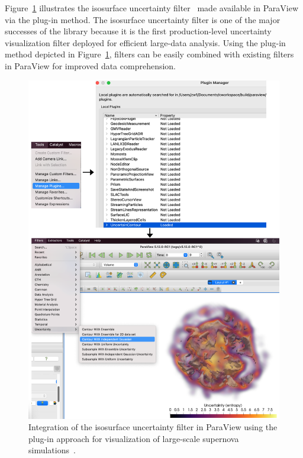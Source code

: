 Figure~\ref{fig:uncertainty-plugin} illustrates the \vtkm isosurface uncertainty filter~\citep{Wang2023, Athawale21} made available in ParaView via the plug-in method. The isosurface uncertainty filter is one of the major successes of the \vtkm library because it is the first production-level uncertainty visualization filter deployed for efficient large-data analysis. Using the plug-in method depicted in Figure~\ref{fig:uncertainty-plugin}, \vtkm filters can be easily combined with existing filters in ParaView for improved data comprehension.

\begin{figure}[htb]
  \includegraphics[width=\linewidth]{figures/isosurfaceUncertaintyPlugin.png}
  \caption{Integration of the \vtkm isosurface uncertainty filter in ParaView using the plug-in approach for visualization of large-scale supernova simulations~\citep{Sandoval2021}.}
  \label{fig:uncertainty-plugin}
\end{figure}



